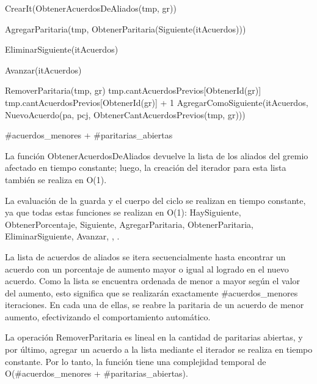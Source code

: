 {

	\state {} \asig CrearIt(ObtenerAcuerdosDeAliados(tmp, gr))		
			
		\state

		\state AgregarParitaria(tmp, ObtenerParitaria(Siguiente(itAcuerdos)))		

		\state EliminarSiguiente(itAcuerdos)										

		\state
		\state Avanzar(itAcuerdos)													
	\endwhile
	\state

	\state {} \asig RemoverParitaria(tmp, gr)											
	\state tmp.cantAcuerdosPrevios[ObtenerId(gr)] \asig tmp.cantAcuerdosPrevios[ObtenerId(gr)] + 1		
	\state AgregarComoSiguiente(itAcuerdos, NuevoAcuerdo(pa, pcj, ObtenerCantAcuerdosPrevios(tmp, gr)))	
}
{\#acuerdos\_menores + \#paritarias\_abiertas}
{La funci\'on ObtenerAcuerdosDeAliados devuelve la lista de los aliados del gremio afectado en tiempo constante; luego, la creaci\'on del iterador para esta lista tambi\'en se realiza en O(1). 

\hspace{10pt} La evaluaci\'on de la guarda y el cuerpo del ciclo se realizan en tiempo constante, ya que todas estas funciones se realizan en O(1): HaySiguiente, ObtenerPorcentaje, Siguiente, AgregarParitaria, ObtenerParitaria, EliminarSiguiente, Avanzar, \lyl, \menor.

\hspace{10pt} La lista de acuerdos de aliados se itera secuencialmente hasta encontrar un acuerdo con un porcentaje de aumento mayor o igual al logrado en el nuevo acuerdo. Como la lista se encuentra ordenada de menor a mayor seg\'un el valor del aumento, esto significa que se realizar\'an exactamente \#acuerdos\_menores iteraciones. En cada una de ellas, se reabre la paritaria de un acuerdo de menor aumento, efectivizando el comportamiento autom\'atico.

\hspace{10pt} La operaci\'on RemoverParitaria es lineal en la cantidad de paritarias abiertas, y por \'ultimo, agregar un acuerdo a la lista mediante el iterador se realiza en tiempo constante. Por lo tanto, la funci\'on tiene una complejidad temporal de O(\#acuerdos\_menores + \#paritarias\_abiertas).  }

